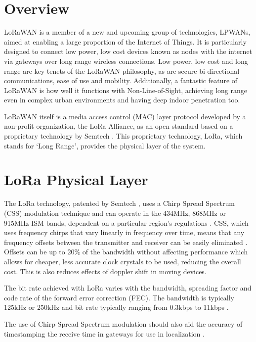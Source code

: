 \documentclass[a4paper]{report}
\begin{document}
  \section{Overview}
    LoRaWAN is a member of a new and upcoming group of technologies, LPWANs, aimed at enabling a large proportion of the Internet of Things. It is particularly designed to connect low power, low cost devices known as nodes with the internet via gateways over long range wireless connections. Low power, low cost and long range are key tenets of the LoRaWAN philosophy, as are secure bi-directional communications, ease of use and mobility. Additionally, a fantastic feature of LoRaWAN is how well it functions with Non-Line-of-Sight, achieving long range even in complex urban environments and having deep indoor penetration too.

    LoRaWAN itself is a media access control (MAC) layer protocol developed by a non-profit organization, the LoRa Alliance, as an open standard based on a proprietary technology by Semtech \cite{Augustin2016}. This proprietary technology, LoRa, which stands for `Long Range', provides the physical layer of the system.

  \section{LoRa Physical Layer}
    The LoRa technology, patented by Semtech \cite{hornbuckle2010fractional}\cite{seller2016low}, uses a Chirp Spread Spectrum (CSS) modulation technique and can operate in the 434MHz, 868MHz or 915MHz ISM bands, dependent on a particular region's regulations \cite{Vangelista2015}. CSS, which uses frequency chirps that vary linearly in frequency over time, means that any frequency offsets between the transmitter and receiver can be easily eliminated \cite{Augustin2016}. Offsets can be up to 20\% of the bandwidth without affecting performance which allows for cheaper, less accurate clock crystals to be used, reducing the overall cost. This is also reduces effects of doppler shift in moving devices.

    The bit rate achieved with LoRa varies with the bandwidth, spreading factor and code rate of the forward error correction (FEC). The bandwidth is typically 125kHz or 250kHz and bit rate typically ranging from 0.3kbps to 11kbps \cite{Vangelista2015}.

    The use of Chirp Spread Spectrum modulation should also aid the accuracy of timestamping the receive time in gateways for use in localization \cite{Wang2016}.
\end{document}
